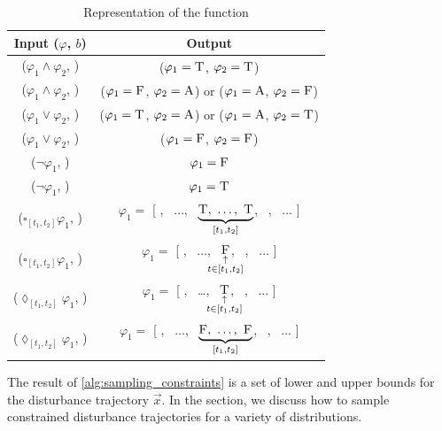\begin{table}
    \centering
    \caption{Representation of the  function}
    \label{tab:inverse_propositions}
    \begin{tabular}{cc} 
        \toprule
        \textbf{Input ($\varphi$, $b$)} & \textbf{Output}  \\
        \midrule
        ($\varphi_1 \land \varphi_2$, \T) & ($\varphi_1 = \textsc{T}$, $\varphi_2 = \textsc{T}$) \\
        ($\varphi_1 \land \varphi_2$, \F) & ($\varphi_1 = \textsc{F}$, $\varphi_2 = \textsc{A}$) or ($\varphi_1 = \textsc{A}$, $\varphi_2 = \textsc{F}$) \\

        ($\varphi_1 \lor \varphi_2$, \T) & ($\varphi_1 = \textsc{T}$, $\varphi_2 = \textsc{A}$) or ($\varphi_1 = \textsc{A}$, $\varphi_2 = \textsc{T}$) \\ 
        ($\varphi_1 \lor \varphi_2$, \F) & ($\varphi_1 = \textsc{F}$, $\varphi_2 = \textsc{F}$) \\

        ($\neg \varphi_1$, \T) & $\varphi_1 = \textsc{F}$ \\ 
        ($\neg \varphi_1$, \F) & $\varphi_1 = \textsc{T}$ \\

        ($\square_{[t_1, t_2]} \varphi_1$, \T) & $\varphi_1 = $ [ \A, \ $\ldots$, \ $\underbrace{\T, \ \ldots, \ \T}_{[t_1,t_2]}$, \ \A, \  $\ldots$ ] \\
        ($\square_{[t_1, t_2]} \varphi_1$, \F)  & $\varphi_1 = $ [ \A, \ $\ldots$, \ $\underset{\substack{\uparrow\\\mathclap{t \in [t_1,t_2]}}}{\F}$, \ \A, \  $\ldots$ ]   \\

        ($\lozenge_{[t_1, t_2]}  \varphi_1$, \T) & $\varphi_1 = $ [ \A, \ \ldots, \ $\underset{\substack{\uparrow\\\mathclap{t \in [t_1,t_2]}}}{\T}$, \ \A, \  $\ldots$ ] \\
        ($\lozenge_{[t_1, t_2]} \varphi_1$, \F)  & $\varphi_1 = $ [ \A, \ $\ldots$, \ $\underbrace{\F, \ \ldots, \ \F}_{[t_1,t_2]}$, \ \A, \  $\ldots$ ] \\
        \bottomrule
    \end{tabular}
\end{table}

The result of \cref{alg:sampling_constraints} is a set of lower and upper bounds for the disturbance trajectory $\vec{x}$. In the section, we discuss how to sample constrained disturbance trajectories for a variety of distributions.




